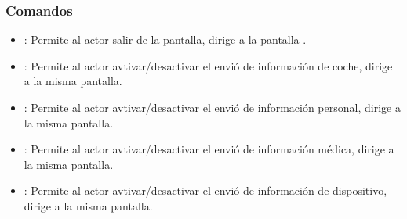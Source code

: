 \subsubsection{Comandos}
    \begin{itemize}
    	\item \btnRegresar[Regresar]: Permite al actor salir de la pantalla, dirige a la pantalla .
    	\item {}: Permite al actor avtivar/desactivar el envió de información de coche, dirige a la misma pantalla.
    	\item {}: Permite al actor avtivar/desactivar el envió de información personal, dirige a la misma pantalla.
    	\item {}: Permite al actor avtivar/desactivar el envió de información médica, dirige a la misma pantalla.
    	\item {}: Permite al actor avtivar/desactivar el envió de información de dispositivo, dirige a la misma pantalla.
    \end{itemize}

